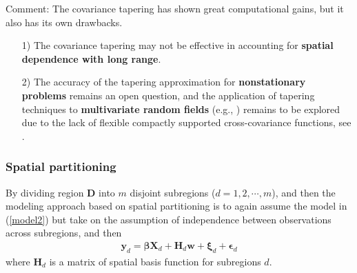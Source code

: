 \documentclass[
12pt, %
a4paper, %
oneside, %
headinclude,footinclude, %
BCOR5mm, %
]{scrartcl}
\begin{document}
\textcolor[rgb]{1.00,0.00,1.00}{Comment:}
The covariance tapering has shown great computational gains, but it also has its own drawbacks.
\begin{itemize}
 \item [1)]The covariance tapering may not be effective in accounting for \textbf{spatial dependence with long range}.
 \item [2)]The accuracy of the tapering approximation for \textbf{nonstationary problems} remains an open question, and the application of tapering techniques to \textbf{multivariate random fields} (e.g.,  \href{https://chenyw68.github.io/Literature/[2015]Covariance tapering for multivariate Gaussian random fields estimation.pdf}{\citep{bevilacqua2016covariance}}) remains to be explored due to the lack of flexible compactly supported cross-covariance functions, see \href{https://chenyw68.github.io/Literature/[2012]Advances and Challenges in Space-time Modelling of Natural Events.pdf}{\citet{porcu2012advances}}.
\end{itemize}
\subsubsection{Spatial partitioning}
By dividing region $\boldsymbol{D}$ into $m$ disjoint subregions ($d = 1, 2, \cdots, m$),  and then the modeling approach based on spatial
partitioning is to again assume the model in (\ref{model2}) but take on the assumption of independence between observations across subregions, and then
\begin{equation}
\begin{aligned}
\boldsymbol{y}_d = \boldsymbol{\beta}\boldsymbol{X}_d + \boldsymbol{H}_d\boldsymbol{w} + \boldsymbol{\xi}_d + \boldsymbol{\epsilon}_d
\end{aligned} \label{model2}
\end{equation}
where $\boldsymbol{H}_d$ is a matrix of spatial basis function for subregions $d$.
\end{document}
